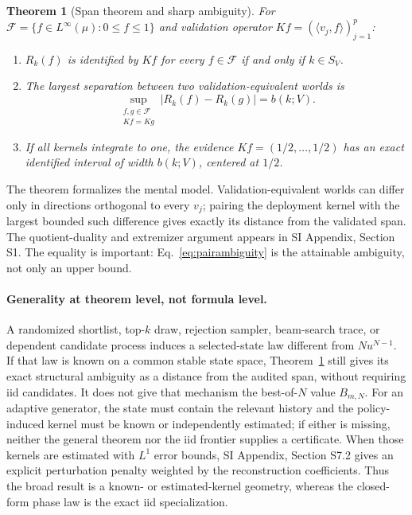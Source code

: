 \documentclass[10pt,twocolumn]{article}
\newtheorem{theorem}{Theorem}
\newcommand{\cF}{\mathcal F}
\begin{document}
\begin{theorem}[Span theorem and sharp ambiguity]
\label{thm:span}
For $\cF=\{f\in L^\infty(\mu):0\le f\le1\}$ and validation operator $Kf=(\langle v_j,f\rangle)_{j=1}^p$:
\begin{enumerate}[label=(\roman*)]
\item $R_k(f)$ is identified by $Kf$ for every $f\in\cF$ if and only if $k\in S_V$.
\item The largest separation between two validation-equivalent worlds is
\begin{equation}
\sup_{\substack{f,g\in\cF\\Kf=Kg}}
|R_k(f)-R_k(g)|=b(k;V).
\label{eq:pairambiguity}
\end{equation}
\item If all kernels integrate to one, the evidence $Kf=(1/2,\ldots,1/2)$ has an exact identified interval of width $b(k;V)$, centered at $1/2$.
\end{enumerate}
\end{theorem}

The theorem formalizes the mental model. Validation-equivalent worlds can differ only in directions orthogonal to every $v_j$; pairing the deployment kernel with the largest bounded such difference gives exactly its distance from the validated span. The quotient-duality and extremizer argument appears in SI Appendix, Section S1. The equality is important: Eq.~\ref{eq:pairambiguity} is the attainable ambiguity, not only an upper bound.

\paragraph{Generality at theorem level, not formula level.}
A randomized shortlist, top-$k$ draw, rejection sampler, beam-search trace, or dependent candidate process induces a selected-state law different from $Nu^{N-1}$. If that law is known on a common stable state space, Theorem~\ref{thm:span} still gives its exact structural ambiguity as a distance from the audited span, without requiring iid candidates. It does not give that mechanism the best-of-$N$ value $B_{m,N}$. For an adaptive generator, the state must contain the relevant history and the policy-induced kernel must be known or independently estimated; if either is missing, neither the general theorem nor the iid frontier supplies a certificate. When those kernels are estimated with $L^1$ error bounds, SI Appendix, Section S7.2 gives an explicit perturbation penalty weighted by the reconstruction coefficients. Thus the broad result is a known- or estimated-kernel geometry, whereas the closed-form phase law is the exact iid specialization.
\end{document}
